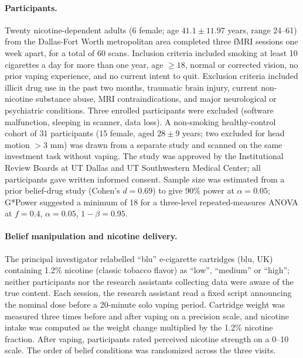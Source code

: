 \documentclass[11pt]{article}
\begin{document}
\paragraph{Participants.} Twenty nicotine-dependent adults (6 female; age $41.1 \pm 11.97$ years, range 24--61) from the Dallas-Fort Worth metropolitan area completed three fMRI sessions one week apart, for a total of 60 scans. Inclusion criteria included smoking at least 10 cigarettes a day for more than one year, age $\geq 18$, normal or corrected vision, no prior vaping experience, and no current intent to quit. Exclusion criteria included illicit drug use in the past two months, traumatic brain injury, current non-nicotine substance abuse, MRI contraindications, and major neurological or psychiatric conditions. Three enrolled participants were excluded (software malfunction, sleeping in scanner, data loss). A non-smoking healthy-control cohort of 31 participants (15 female, aged $28 \pm 9$ years; two excluded for head motion $>3$ mm) was drawn from a separate study and scanned on the same investment task without vaping. The study was approved by the Institutional Review Boards at UT Dallas and UT Southwestern Medical Center; all participants gave written informed consent. Sample size was estimated from a prior belief-drug study (Cohen's $d=0.69$) to give 90\% power at $\alpha=0.05$; G*Power suggested a minimum of 18 for a three-level repeated-measures ANOVA at $f=0.4$, $\alpha=0.05$, $1-\beta=0.95$.

\paragraph{Belief manipulation and nicotine delivery.} The principal investigator relabelled ``blu'' e-cigarette cartridges (blu, UK) containing 1.2\% nicotine (classic tobacco flavor) as ``low'', ``medium'' or ``high''; neither participants nor the research assistants collecting data were aware of the true content. Each session, the research assistant read a fixed script announcing the nominal dose before a 20-minute solo vaping period. Cartridge weight was measured three times before and after vaping on a precision scale, and nicotine intake was computed as the weight change multiplied by the 1.2\% nicotine fraction. After vaping, participants rated perceived nicotine strength on a 0--10 scale. The order of belief conditions was randomized across the three visits.
\end{document}

